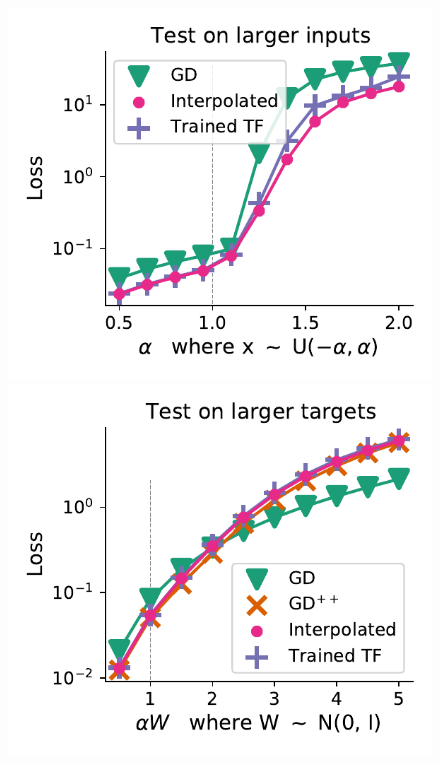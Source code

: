 \documentclass{article}
\theoremstyle{plain}
\theoremstyle{definition}
\theoremstyle{remark}
\begin{document}
\begin{figure}
\begin{center}
\begin{minipage}{.24\textwidth}
  \centering
  \begin{center}
    \includegraphics[width=1.\textwidth]{Final_figures/linear/ten_layers_rec/normal_11.pdf}
  \end{center}
  \vspace{-10pt}
\end{minipage}
\begin{minipage}{.24\textwidth}
  \centering
  \begin{center}
    \includegraphics[width=1.\textwidth]{Final_figures/linear/ten_layers_rec/normal_13.pdf}

\end{center}
\end{minipage}
\end{center}
\end{figure}
\end{document}
